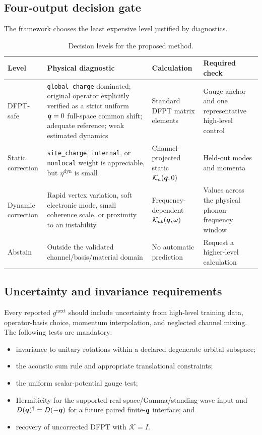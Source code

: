 \subsection{Four-output decision gate}

The framework chooses the least expensive level justified by diagnostics.

\begin{table}[htbp]
\centering
\caption{Decision levels for the proposed method.}
\label{tab:decisiongate}
\begin{tabularx}{\linewidth}{@{}p{2.6cm}XXp{3.2cm}@{}}
\toprule
Level & Physical diagnostic & Calculation & Required check \\
\midrule
DFPT-safe & \texttt{global\_charge} dominated; original operator explicitly
verified as a strict uniform $\bm{q}=0$ full-space common shift; adequate reference;
weak estimated dynamics
& Standard DFPT matrix elements & Gauge anchor and one representative high-level
control \\
Static correction & \texttt{site\_charge}, \texttt{internal}, or
\texttt{nonlocal} weight is appreciable, but
$\eta^{\mathrm{dyn}}$ is small & Channel-projected static
$\mathcal K_a(\bm{q},0)$ & Held-out modes and momenta \\
Dynamic correction & Rapid vertex variation, soft electronic mode, small
coherence scale, or proximity to an instability & Frequency-dependent
$\mathcal K_{ab}(\bm{q},\omega)$ & Values across the physical phonon-frequency
window \\
Abstain & Outside the validated channel/basis/material domain & No automatic
prediction & Request a higher-level calculation \\
\bottomrule
\end{tabularx}
\end{table}

\subsection{Uncertainty and invariance requirements}

Every reported $g^{\mathrm{next}}$ should include uncertainty from high-level
training data, operator-basis choice, momentum interpolation, and neglected
channel mixing.  The following tests are mandatory:

\begin{itemize}
  \item invariance to unitary rotations within a declared degenerate orbital
  subspace;
  \item the acoustic sum rule and appropriate translational constraints;
  \item the uniform scalar-potential gauge test;
  \item Hermiticity for the supported real-space/Gamma/standing-wave input and
  $D(\bm{q})^\dagger=D(-\bm{q})$ for a future paired finite-$\bm{q}$ interface; and
  \item recovery of uncorrected DFPT with $\mathcal K=I$.
\end{itemize}

